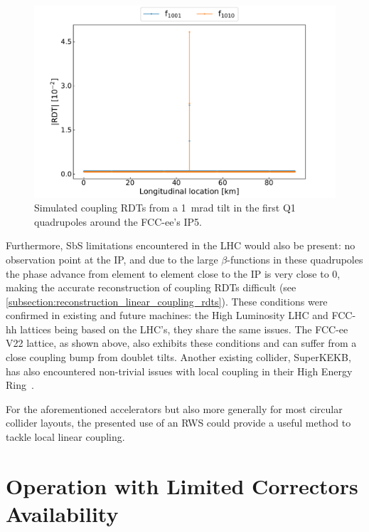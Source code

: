 \begin{figure}[!htb]
    \centering
    \includegraphics*[width=\textwidth]{Figures/IR_Coupling_Correction/fccee_ip5_coupling_bump.pdf}
    \caption{Simulated coupling RDTs from a \qty{1}{\milli\radian} tilt in the first Q\num{1} quadrupoles around the FCC-ee's IP\num{5}.}
    \label{figure:fccee_ip5_coupling_bump}
\end{figure}

Furthermore, SbS limitations encountered in the LHC would also be present: no observation point at the IP, and due to the large \(\beta\)-functions in these quadrupoles the phase advance from element to element close to the IP is very close to \num{0}, making the accurate reconstruction of coupling RDTs difficult (see \cref{subsection:reconstruction_linear_coupling_rdts}).
These conditions were confirmed in existing and future machines: the High Luminosity LHC and FCC-hh lattices being based on the LHC's, they share the same issues.
The FCC-ee V\num{22} lattice, as shown above, also exhibits these conditions and can suffer from a close coupling bump from doublet tilts.
Another existing collider, SuperKEKB, has also encountered non-trivial issues with local coupling in their High Energy Ring~\cite{ICFA:Morita:Optics_Corrections_including_IP_Local_Coupling_at_SuperKEKB}.

For the aforementioned accelerators but also more generally for most circular collider layouts, the presented use of an RWS could provide a useful method to tackle local linear coupling.

\section{Operation with Limited Correctors Availability}
\label{section:limited_correctors_availability}

